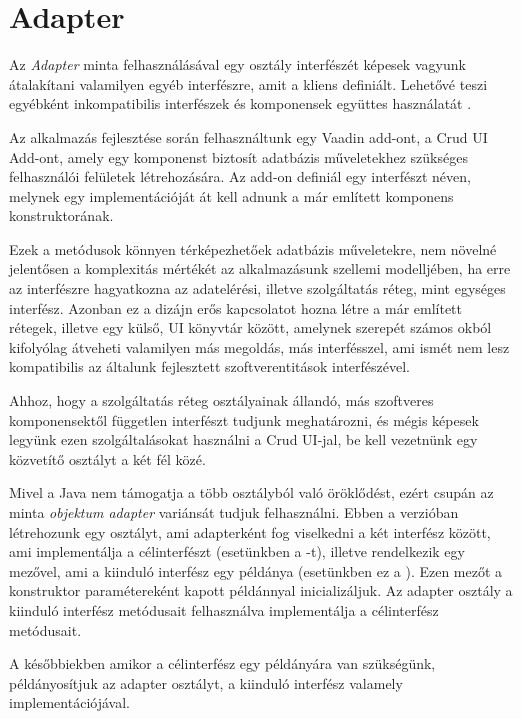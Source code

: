 \section{Adapter}

Az \emph{Adapter} minta felhasználásával egy osztály interfészét képesek vagyunk átalakítani valamilyen egyéb interfészre, amit a kliens definiált. Lehetővé teszi egyébként inkompatibilis interfészek és komponensek együttes használatát \cite{gamma1995elements}. \par

Az alkalmazás fejlesztése során felhasználtunk egy Vaadin add-ont, a Crud UI Add-ont, amely egy komponenst biztosít adatbázis műveletekhez szükséges felhasználói felületek létrehozására. Az add-on definiál egy interfészt  néven, melynek egy implementációját át kell adnunk a már említett komponens konstruktorának.


Ezek a metódusok könnyen térképezhetőek adatbázis műveletekre, nem növelné jelentősen a komplexitás mértékét az alkalmazásunk szellemi modelljében, ha erre az interfészre hagyatkozna az adatelérési, illetve szolgáltatás réteg, mint egységes interfész. Azonban ez a dizájn erős kapcsolatot hozna létre a már említett rétegek, illetve egy külső, UI könyvtár között, amelynek szerepét számos okból kifolyólag átveheti valamilyen más megoldás, más interfésszel, ami ismét nem lesz kompatibilis az általunk fejlesztett szoftverentitások interfészével. \par


Ahhoz, hogy a szolgáltatás réteg osztályainak állandó, más szoftveres komponensektől független interfészt tudjunk meghatározni, és mégis képesek legyünk ezen szolgáltalásokat használni a Crud UI-jal, be kell vezetnünk egy közvetítő osztályt a két fél közé. \par

Mivel a Java nem támogatja a több osztályból való öröklődést, ezért csupán az  minta \emph{objektum adapter} variánsát tudjuk felhasználni. Ebben a verzióban létrehozunk egy osztályt, ami adapterként fog viselkedni a két interfész között, ami implementálja a célinterfészt (esetünkben a -t), illetve rendelkezik egy mezővel, ami a kiinduló interfész egy példánya (esetünkben ez a ). Ezen mezőt a konstruktor paramétereként kapott példánnyal inicializáljuk. Az adapter osztály a kiinduló interfész metódusait felhasználva implementálja a célinterfész metódusait. \par


A későbbiekben amikor a célinterfész egy példányára van szükségünk, példányosítjuk az adapter osztályt, a kiinduló interfész valamely implementációjával.

